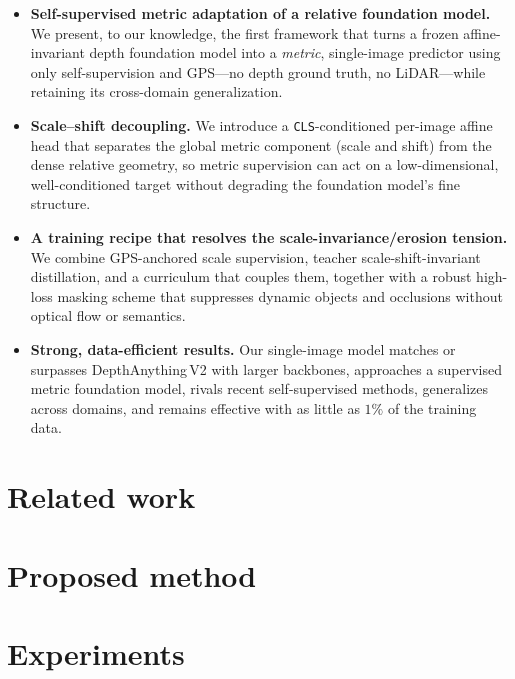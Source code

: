 \documentclass[journal]{IEEEtran}
\begin{document}
\begin{itemize}
    \item \textbf{Self-supervised metric adaptation of a relative foundation model.} We present, to our knowledge, the first framework that turns a frozen affine-invariant depth foundation model into a \emph{metric}, single-image predictor using only self-supervision and GPS---no depth ground truth, no LiDAR---while retaining its cross-domain generalization.
    \item \textbf{Scale--shift decoupling.} We introduce a \texttt{CLS}-conditioned per-image affine head that separates the global metric component (scale and shift) from the dense relative geometry, so metric supervision can act on a low-dimensional, well-conditioned target without degrading the foundation model's fine structure.
    \item \textbf{A training recipe that resolves the scale-invariance/erosion tension.} We combine GPS-anchored scale supervision, teacher scale-shift-invariant distillation, and a curriculum that couples them, together with a robust high-loss masking scheme that suppresses dynamic objects and occlusions without optical flow or semantics.
    \item \textbf{Strong, data-efficient results.} Our single-image model matches or surpasses DepthAnything\,V2 with larger backbones, approaches a supervised metric foundation model, rivals recent self-supervised methods, generalizes across domains, and remains effective with as little as $1\%$ of the training data.
\end{itemize}


\section{Related work}\label{sec2}


\section{Proposed method}\label{sec3}




\section{Experiments}\label{sec4}

\end{document}

